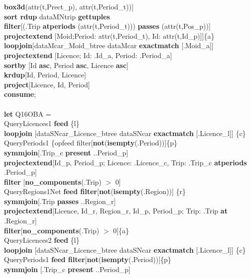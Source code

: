 \documentclass[a4paper]{article}
\newcommand{\op}[1]{\textbf{#1}}
\begin{document}
\begin{scriptsize}
\begin{tabbing}
\>\>\>\op{box3d}(attr(t,Prect\_p), attr(t,Period\_t))]\\
\>\>\op{sort rdup} dataMNtrip \op{gettuples}\\
\>\>\op{filter}[(.Trip \op{atperiods} (attr(t,Period\_t))) \op{passes}
(attr(t,Pos\_p))]\\
\>\>\op{projectextend} [Moid;Period: attr(t,Period\_t), Id:
attr(t,Id\_p)]]\{a\}\\
\>\op{loopjoin}[dataMcar\_Moid\_btree dataMcar \op{exactmatch} [.Moid\_a]]\\
\>\op{projectextend} [Licence; Id: .Id\_a, Period: .Period\_a]\\
\>\op{sortby} [Id \op{asc}, Period \op{asc}, Licence \op{asc}]\\
\>\op{krdup}[Id, Period, Licence]\\
\>\op{project}[Licence, Id, Period]\\
\op{consume};\\
\\
\op{let} Q16OBA =\\
\>QueryLicences1 \op{feed} \{l\}\\
\>\>\>\op{loopjoin} [dataSNcar\_Licence\_btree dataSNcar \op{exactmatch}
[.Licence\_l]] \{c\}\\
\>\>QueryPeriods1 \{op{feed filter}[\op{not}(\op{isempty}(.Period))]\{p\}\\
\>\>\op{symmjoin}[.Trip\_c \op{present} ..Period\_p]\\
\>\>\>\op{projectextend}[Id\_p, Period\_p; Licence: .Licence\_c, Trip: .Trip\_c
\op{atperiods} .Period\_p]\\
\>\>\>\op{filter} [\op{no\_components}(.Trip) $>$ 0]\\
\>\>QueryRegions1Net \op{feed filter}[\op{not}(\op{isempty}(.Region))] \{r\}\\
\>\>\op{symmjoin}[.Trip \op{passes} ..Region\_r]\\
\>\>\op{projectextend}[Licence, Id\_r, Region\_r, Id\_p, Period\_p; Trip: .Trip
\op{at} .Region\_r]\\
\>\>\op{filter}[\op{no\_components}(.Trip) $>$ 0]\{a\}\\
\>QueryLicences2 \op{feed} \{l\}\\
\>\>\>\op{loopjoin} [dataSNcar\_Licence\_btree dataSNcar \op{exactmatch}
[.Licence\_l]] \{c\}\\
\>\>QueryPeriods1 \op{feed filter}[\op{not}(\op{isempty}(.Period))]\{p\}\\
\>\>\op{symmjoin} [.Trip\_c \op{present} ..Period\_p]\\

\end{tabbing}
\end{scriptsize}
\end{document}
